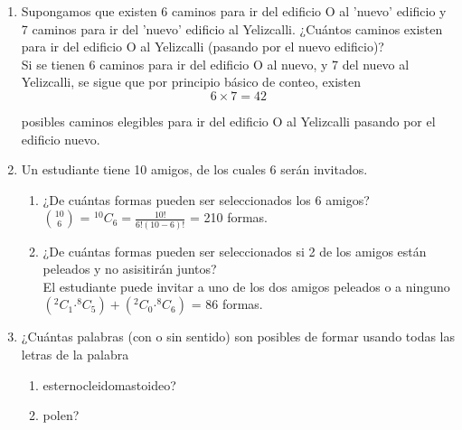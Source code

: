 \documentclass[12pt,a4paper]{report}
\newcommand*{\Comb}[2]{{}^{#1}C_{#2}}
\begin{document}
\begin{enumerate}
   \item {
   Supongamos que existen 6 caminos para ir del edificio O al ’nuevo’
   edificio y 7 caminos para ir del ’nuevo’ edificio al Yelizcalli.
   ¿Cuántos caminos existen para ir del edificio O al Yelizcalli
   (pasando por el nuevo edificio)?\\

	Si se tienen 6 caminos para ir del edificio O al nuevo, y 7 del nuevo al
	Yelizcalli, se sigue que por principio básico de conteo, existen
		$$ 6 \times 7 = 42$$

	posibles caminos elegibles para ir del edificio O al Yelizcalli pasando por
	el edificio nuevo.
	}

   \item {
    Un estudiante tiene 10 amigos, de los cuales 6 serán invitados.\\
		\begin{enumerate}
		\item{
		¿De cuántas formas pueden ser seleccionados los 6 amigos?\\

		$10 \choose 6 $ = $\Comb{10}{6}=\frac{10!}{6!(10-6)!}$ = 210 formas.\\
		}

		\item{
        ¿De cuántas formas pueden ser seleccionados si 2 de los amigos están
        peleados y no asisitirán juntos?\\

        El estudiante puede invitar a uno de los dos amigos peleados o a ninguno \\

         $(\Comb{2}{1} \boldsymbol{\cdot} \Comb{8}{5}) +(\Comb{2}{0} \boldsymbol{\cdot} \Comb{8}{6})$ = 86 formas.\\
		}
	\end{enumerate}
	}


   \item {
    ¿Cuántas palabras (con o sin sentido) son posibles de formar usando todas
    las letras de la palabra\\

	\begin{enumerate}
   \item {
	esternocleidomastoideo?\\

   }

   \item {
   polen?\\

}
\end{enumerate}}
\end{enumerate}
\end{document}
